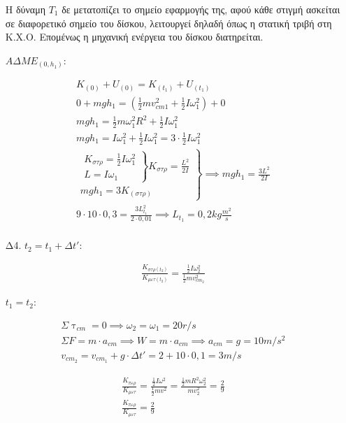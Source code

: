 \documentclass[12pt]{article}
\begin{document}
\begin{enumerate}
    Η δύναμη $T_1$ δε μετατοπίζει το σημείο εφαρμογής της, αφού κάθε στιγμή ασκείται σε διαφορετικό σημείο του δίσκου, λειτουργεί δηλαδή όπως η στατική τριβή στη Κ.Χ.Ο. Επομένως η μηχανική ενέργεια του δίσκου διατηρείται.

    $ΑΔΜΕ_{(0,h_1)}:$

    \begin{gather*}
      K_{(0)}+U_{(0)}=K_{(t_1)}+U_{(t_1)} \\      0+mgh_1=\left( \frac{1}{2}mv_{cm1}^2+\frac{1}{2}Iω_1^2\right) + 0 \\
      mgh_1=\frac{1}{2}mω_1^2R^2+\frac{1}{2}Iω_1^2 \\
      mgh_1=Iω_1^2+\frac{1}{2}Iω_1^2=3\cdot\frac{1}{2}Iω_1^2 \\
      \left. \begin{matrix} \left.
        \begin{matrix}K_{στρ}=\frac{1}{2}Iω_1^2 \\ L=Iω_1
        \end{matrix}
        \right\} K_{στρ}=\frac{L^2}{2I} \\
        mgh_1=3K_{(στρ)}
      \end{matrix}
      \right\}
      \implies mgh_1=\frac{3L^2}{2I} \\
      9\cdot 10\cdot 0,3=\frac{3L_{t_1}^2}{2\cdot 0,01}
      \implies L_{t_1}=0,2kg \frac{m^2}{s} \\
    \end{gather*}

    \item [Δ4.]
    $t_2=t_1+Δt'$:

    \begin{gather*}
      \frac{K_{στρ(t_2)}}{K_{μετ(t_2)}}=\frac{\frac{1}{2}Iω_2^2}{\frac{1}{2}mv_{cm_2}^2}
    \end{gather*}

    $t_1=t_2$:

    \begin{gather*}
      Σ\uptau_{cm}=0\implies ω_2=ω_1=20r/s \\
      ΣF=m\cdot a_{cm}\implies W=m\cdot a_{cm}\implies a_{cm}=g=10 m/s^2 \\
      v_{cm_2}=v_{cm_1}+g\cdot Δt'=2+10\cdot 0,1=3m/s
    \end{gather*}

    \begin{gather*}
      \frac{K_{περ}}{K_{μετ}}=\frac{\frac{1}{2}Iω^2}{\frac{1}{2}mv^2}=\frac{\frac{1}{2}mR^2ω_2^2}{mv_2^2}=\frac{2}{9} \\
      \frac{K_{περ}}{K_{μετ}}=\frac{2}{9}
    \end{gather*}

  \end{enumerate}
\end{document}
